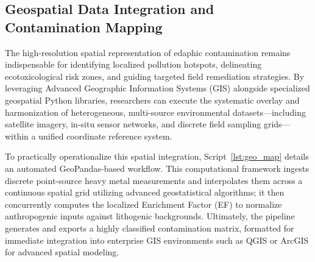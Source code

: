 \documentclass[environments,article,submit,pdftex,moreauthors]{Definitions/mdpi}
\begin{document}
\subsection{Geospatial Data Integration and Contamination Mapping}\label{sec2.3}

The high-resolution spatial representation of edaphic contamination remains indispensable for identifying localized pollution hotspots, delineating ecotoxicological risk zones, and guiding targeted field remediation strategies. By leveraging Advanced Geographic Information Systems (GIS) alongside specialized geospatial Python libraries, researchers can execute the systematic overlay and harmonization of heterogeneous, multi-source environmental datasets—including satellite imagery, in-situ sensor networks, and discrete field sampling grids—within a unified coordinate reference system. 

To practically operationalize this spatial integration, Script~\ref{lst:geo_map} details an automated GeoPandas-based workflow. This computational framework ingests discrete point-source heavy metal measurements and interpolates them across a continuous spatial grid utilizing advanced geostatistical algorithms; it then concurrently computes the localized Enrichment Factor (EF) to normalize anthropogenic inputs against lithogenic backgrounds. Ultimately, the pipeline generates and exports a highly classified contamination matrix, formatted for immediate integration into enterprise GIS environments such as QGIS or ArcGIS for advanced spatial modeling.
\end{document}
